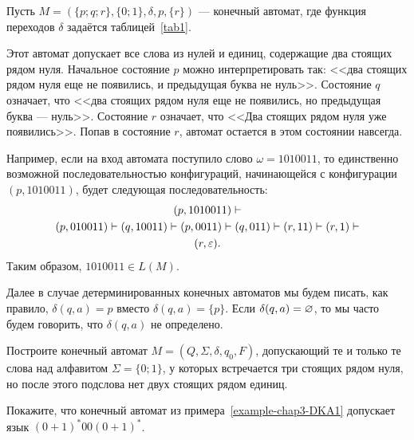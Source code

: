 \begin{myexample}
\label{example-chap3-DKA1}
Пусть $M=(\{p;q;r\},\{0;1\},\delta,p,\{r\})$ --- конечный автомат, где функция переходов $\delta$ задаётся таблицей~\ref{tab1}. 

Этот автомат допускает все слова из нулей и единиц, содержащие два стоящих рядом нуля. Начальное состояние $p$ можно интерпретировать так: <<два стоящих рядом нуля еще не появились, и предыдущая буква не нуль>>. Состояние $q$ означает, что <<два стоящих рядом нуля еще не появились, но предыдущая буква --- нуль>>. Состояние $r$ означает, что <<Два стоящих рядом нуля уже появились>>. Попав в состояние $r$, автомат остается в этом состоянии навсегда.

Например, если на вход автомата поступило слово $\omega=1010011$, то единственно возможной последовательностью конфигураций, начинающейся с конфигурации $(p,1010011)$, будет следующая последовательность:
\begin{multline*}
(p,1010011)
    \vdash\\(p,010011)
    \vdash(q,10011)
    \vdash(p,0011)
    \vdash(q,011)
    \vdash(r,11)
    \vdash(r,1)
    \vdash\\(r,\varepsilon).
\end{multline*}
Таким образом, $1010011\in L(M)$.
\end{myexample}

Далее в случае детерминированных конечных автоматов мы будем писать, как правило, $\delta(q,a)=p$ вместо $\delta(q,a)=\{p\}$. Если $\delta(q,a)=\varnothing$, то мы часто будем говорить, что $\delta(q,a)$ не определено.

\begin{myproblem}
Построите конечный автомат $M=(Q,\Sigma,\delta,q_0,F)$, допускающий те и только те слова над алфавитом $\Sigma=\{0;1\}$, у которых встречается три стоящих рядом нуля, но после этого подслова нет двух стоящих рядом единиц.
\end{myproblem}

\begin{myproblem}
Покажите, что конечный автомат из примера~\ref{example-chap3-DKA1} допускает язык $(0+1)^*00(0+1)^*$.
\end{myproblem}

